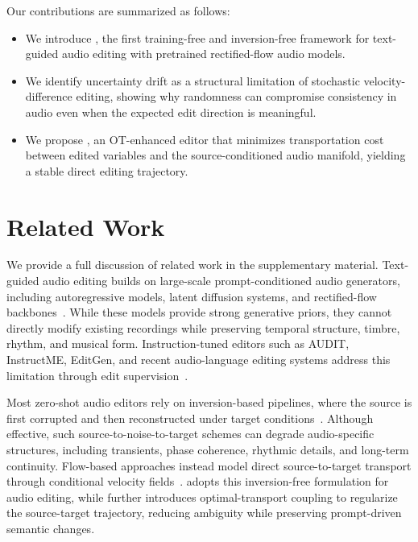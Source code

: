 Our contributions are summarized as follows:
\begin{itemize}
    \item We introduce \method, the first training-free and inversion-free framework for text-guided audio editing with pretrained rectified-flow audio models.
    \item We identify uncertainty drift as a structural limitation of stochastic velocity-difference editing, showing why randomness can compromise consistency in audio even when the expected edit direction is meaningful.
    \item We propose \methodplus, an OT-enhanced editor that minimizes transportation cost between edited variables and the source-conditioned audio manifold, yielding a stable direct editing trajectory.
\end{itemize}

\section{Related Work}
\label{sec:relatedwork}

We provide a full discussion of related work in the supplementary material.
Text-guided audio editing builds on large-scale prompt-conditioned audio generators, including autoregressive models, latent diffusion systems, and rectified-flow backbones~\cite{kreuk2023audiogentextuallyguidedaudio,copet2024simplecontrollablemusicgeneration,liu2023audioldmtexttoaudiogenerationlatent,liu2023audioldm2,ghosal2023texttoaudiogenerationusinginstructiontuned,evans2026stableaudio3,hung2024tangoflux,fei2024fluxmusic}. 
While these models provide strong generative priors, they cannot directly modify existing recordings while preserving temporal structure, timbre, rhythm, and musical form. 
Instruction-tuned editors such as AUDIT, InstructME, EditGen, and recent audio-language editing systems address this limitation through edit supervision~\cite{wang2023auditaudioeditingfollowing,han2023instructmeinstructionguidedmusic,sioros2025editgenharnessingcrossattentioncontrol,ungersbock2025saoinstructfreeformaudioediting,lan2025guidingaudioeditingaudio,tao2026mmeditunifiedframeworkmultitype}.

Most zero-shot audio editors rely on inversion-based pipelines, where the source is first corrupted and then reconstructed under target conditions~\cite{meng2022sdeditguidedimagesynthesis,manor2024zeroshotunsupervisedtextbasedaudio,zhang2024musicmaguszeroshottexttomusicediting,novack2024dittodiffusioninferencetimetoptimization,xu2024promptguidedpreciseaudioediting,jia2025audioeditor}. 
Although effective, such source-to-noise-to-target schemes can degrade audio-specific structures, including transients, phase coherence, rhythmic details, and long-term continuity. 
Flow-based approaches instead model direct source-to-target transport through conditional velocity fields~\cite{gao2026rfmeditingrectifiedflowmatching,kulikov2025floweditinversionfreetextbasedediting}. 
\method adopts this inversion-free formulation for audio editing, while \methodplus further introduces optimal-transport coupling to regularize the source-target trajectory, reducing ambiguity while preserving prompt-driven semantic changes.

